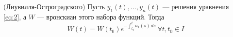 \documentclass[11pt]{article}
\begin{document}
\begin{theorem}
    (Лиувилля-Остроградского) Пусть $y_1(t), \ldots, y_n(t)$ --- решения уравнения \eqref{eq:2}, а $W$ --- вронскиан этого набора функций. Тогда
    \[  W(t) = W(t_0) e^{-\int_{t_0}^{t} a_1(s)\, ds} \ \forall t,t_0 \in I \] 
\end{theorem}
\end{document}

